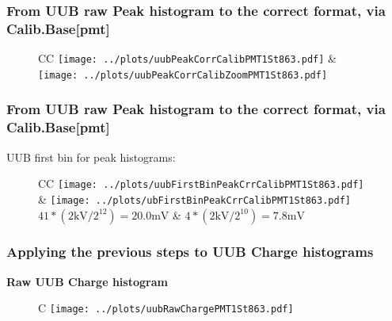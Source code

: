 \documentclass[aspectratio=169]{beamer}
\begin{document}
\begin{frame}
	\frametitle{From UUB raw Peak histogram to the correct format, via Calib.Base[pmt]}
	\begin{figure}
		\centering
		\begin{tabularx}{\textwidth}{CC}
			\texttt{[image: ../plots/uubPeakCorrCalibPMT1St863.pdf]}
			&
			\texttt{[image: ../plots/uubPeakCorrCalibZoomPMT1St863.pdf]}
			\\
		\end{tabularx}
	\end{figure}
\end{frame}


\begin{frame}
	\frametitle{From UUB raw Peak histogram to the correct format, via Calib.Base[pmt]}
	UUB first bin for peak histograms:

	\begin{figure}
		\centering
		\begin{tabularx}{\textwidth}{CC}
			\texttt{[image: ../plots/uubFirstBinPeakCrrCalibPMT1St863.pdf]}
			&
			\texttt{[image: ../plots/ubFirstBinPeakCrrCalibPMT1St863.pdf]}
			\\
			$41*(2 \mathrm{kV}/2^{12}) = 20.0\mathrm{mV}$ 
			&
			$4*(2 \mathrm{kV}/2^{10}) = 7.8 \mathrm{mV}$
		\end{tabularx} 
	\end{figure}
\end{frame}




\begin{frame}
	\frametitle{Applying the previous steps to UUB Charge histograms}
	{\bf Raw UUB Charge histogram}
	\begin{figure}
		\begin{tabularx}{\textwidth}{C}
			\texttt{[image: ../plots/uubRawChargePMT1St863.pdf]}
		\end{tabularx}
	\end{figure}
\end{frame}
\end{document}
